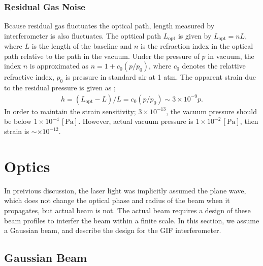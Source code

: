 \subsubsection{Residual Gas Noise}
Bcause residual gas fluctuates the optical path, length measured by interferometer is also fluctuates. The opttical path $L_{\mathrm{opt}}$ is given by $L_{\mathrm{opt}}=nL$, where $L$ is the length of the baseline and $n$ is the refraction index in the optical path relative to the path in the vacuum. Under the pressure of $p$ in vacuum, the index $n$ is approximated as $n = 1 + c_0(p/p_0)$, where $c_0$ denotes the relattive refractive index, $p_0$ is pressure in standard air at 1 atm. The apparent strain due to the residual pressure is given as \cite{ciddor1996refractive};
\begin{eqnarray}
  h = (L_{\mathrm{opt}}-L)/L = c_0(p/p_0) \sim 3\times10^{-9} p.
\end{eqnarray}
In order to maintain the strain sensitivity; $3\times10^{-13}$, the vacuum pressure should be below $1\times10^{-4}\,[\mathrm{Pa}]$. However, actual vacuum pressure is $1\times10^{-2}\,[\mathrm{Pa}]$, then strain is $\sim\times10^{-12}$.


\section{Optics} \label{sec:sec43}
In preivious discussion, the laser light was implicitly assumed the plane wave, which does not change the optical phase and radius of the beam when it propagates, but actual beam is not. The actual beam requires a design of these beam profiles to interfer the beam within a finite scale. In this section, we assume a Gaussian beam, and describe the design for the GIF interferometer.

\subsection{Gaussian Beam}
